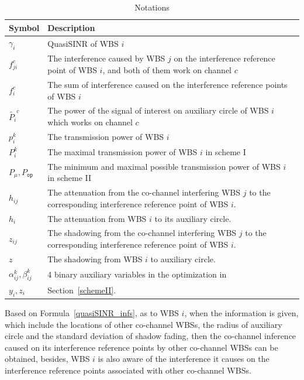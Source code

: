\documentclass[times]{ettauth}
\theoremstyle{mytheoremstyle}
\theoremstyle{mytheoremstyle}
\theoremstyle{mytheoremstyle}
\begin{document}
\begin{table}[h]
\caption{Notations}
\label{tab1}
\centering
\begin{tabular}{l p{6.5cm}}
\toprule
Symbol & Description \\
\midrule
$\gamma_i$ & QuasiSINR of WBS $i$\\
$f_{ji}^c$  & The interference caused by WBS $j$ on the interference reference point of WBS $i$, and both of them work on channel $c$\\
$f_i^c$ & The sum of interference caused on the interference reference points of WBS $i$ \\
$\tilde{P_i}^c$ & The power of the signal of interest on auxiliary circle of WBS $i$ which works on channel $c$     \\
$p_i^k$		& The transmission power of WBS $i$\\
$P_i^k$		& The maximal transmission power of WBS $i$ in scheme I\\
$P_\mu, P_{\mathtt{op}}$		& The minimum and maximal possible transmission power of WBS $i$ in scheme II\\
$h_{ij}$ & The attenuation from the co-channel interfering WBS $j$ to the corresponding interference reference point of WBS $i$.\\
$h_{i}$ & The attenuation from WBS $i$ to its auxiliary circle.\\
$z_{ij}$ & The shadowing from the co-channel interfering  WBS $j$ to the corresponding interference reference point of WBS $i$.\\
$z$ & The shadowing from WBS $i$ to auxiliary circle.\\
$\alpha_{ij}^k,\beta_{ij}^k$ & 4 binary auxiliary variables in the optimization in\\
$y_i, z_i$ & Section~\ref{schemeII}.\\
\bottomrule
\end{tabular}
\end{table}




Based on Formula~\ref{quasiSINR_infs}, as to WBS $i$, when the information is given, which include the locations of other co-channel WBSs, the radius of auxiliary circle and the standard deviation of shadow fading, then the co-channel inference caused on its interference reference points by other co-channel WBSs can be obtained, besides, WBS $i$ is also aware of the interference it causes on the interference reference points associated with other co-channel WBSs.
\end{document}
